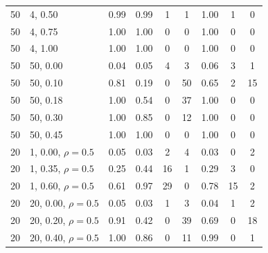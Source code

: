 \begin{table}[p]
{\begin{tabular}{llccccccc}
50 & 4, 0.50 & 0.99 & 0.99 & 1 & 1 & 1.00 & 1 & 0 \\
50 & 4, 0.75 & 1.00 & 1.00 & 0 & 0 & 1.00 & 0 & 0 \\
50 & 4, 1.00 & 1.00 & 1.00 & 0 & 0 & 1.00 & 0 & 0 \\
50 & 50, 0.00 & 0.04 & 0.05 & 4 & 3 & 0.06 & 3 & 1 \\
50 & 50, 0.10 & 0.81 & 0.19 & 0 & 50 & 0.65 & 2 & 15 \\
50 & 50, 0.18 & 1.00 & 0.54 & 0 & 37 & 1.00 & 0 & 0 \\
50 & 50, 0.30 & 1.00 & 0.85 & 0 & 12 & 1.00 & 0 & 0 \\
50 & 50, 0.45 & 1.00 & 1.00 & 0 & 0 & 1.00 & 0 & 0 \\
20 & 1, 0.00, $\rho=0.5$ & 0.05 & 0.03 & 2 & 4 & 0.03 & 0 & 2 \\
20 & 1, 0.35, $\rho=0.5$ & 0.25 & 0.44 & 16 & 1 & 0.29 & 3 & 0 \\
20 & 1, 0.60, $\rho=0.5$ & 0.61 & 0.97 & 29 & 0 & 0.78 & 15 & 2 \\
20 & 20, 0.00, $\rho=0.5$ & 0.05 & 0.03 & 1 & 3 & 0.04 & 1 & 2 \\
20 & 20, 0.20, $\rho=0.5$ & 0.91 & 0.42 & 0 & 39 & 0.69 & 0 & 18 \\
20 & 20, 0.40, $\rho=0.5$ & 1.00 & 0.86 & 0 & 11 & 0.99 & 0 & 1 \\
\bottomrule
\end{tabular}}
\end{table}
\clearpage

